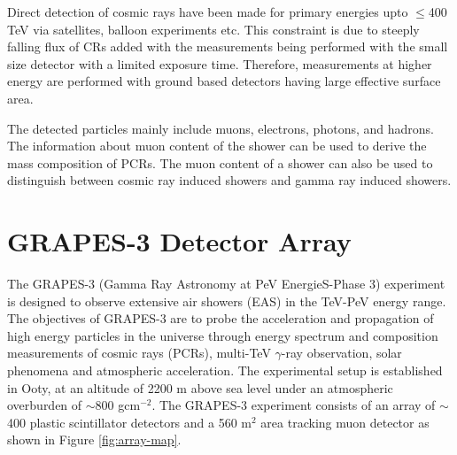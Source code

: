 \documentclass[12pt]{article}
\begin{document}
Direct detection of cosmic rays have been made for primary energies upto $\leq$400 TeV \cite{anuj} via satellites, balloon experiments etc. This constraint is due to steeply falling flux of CRs added with the measurements being performed with the small size detector with a limited exposure time. Therefore, measurements at higher energy are performed with ground based detectors having large effective surface area. 

The detected particles mainly include muons, electrons, photons,  and hadrons. The information about muon content of the shower can be used to derive the mass composition of PCRs. The muon content of a shower can also be used to distinguish between cosmic ray induced showers and gamma ray induced showers. 

\section{GRAPES-3 Detector Array}

The GRAPES-3 (Gamma Ray Astronomy at PeV EnergieS-Phase 3) experiment is
designed to observe extensive air showers (EAS) in the TeV-PeV energy range.
The objectives of GRAPES-3 are to probe the acceleration and propagation of
high energy particles in the universe through energy spectrum and composition
measurements of cosmic rays (PCRs), multi-TeV $\gamma$-ray observation, solar
phenomena and atmospheric acceleration. The experimental setup is established
in Ooty, at an altitude of 2200 m above sea level under an atmospheric
overburden of $\sim$800 gcm$^{-2}$. The GRAPES-3 experiment consists of an
array of $\sim$400 plastic scintillator detectors  and a 560 m$^2$ area
tracking muon detector as shown in Figure \ref{fig:array-map}. 
\end{document}
